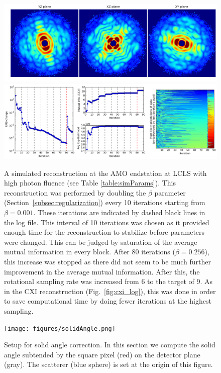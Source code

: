 \documentclass[]{iucr}              %
\begin{document}
\begin{figure}
\caption{A simulated reconstruction at the AMO endstation at LCLS with high photon fluence (see Table \ref{table:simParams}). This reconstruction was performed by doubling the $\beta$ parameter (Section~\ref{subsec:regularization}) every 10 iterations starting from $\beta=0.001$. These iterations are indicated by dashed black lines in the log file. This interval of 10 iterations was chosen as it provided enough time for the reconstruction to stabilize before parameters were changed. This can be judged by saturation of the average mutual information in every block. After 80 iterations ($\beta = 0.256$), this increase was stopped as there did not seem to be much further improvement in the average mutual information. After this, the rotational sampling rate was increased from 6 to the target of 9. As in the CXI reconstruction (Fig.~\ref{fig:cxi_log}), this was done in order to save computational time by doing fewer iterations at the highest sampling.}
\includegraphics[width=\textwidth]{figures/amo_high_intens.png} \label{fig:amo_high_intens}
\includegraphics[width=\textwidth]{figures/amo_high_log.png} \label{fig:amo_high_log}
\end{figure}

\begin{figure}
\caption{Setup for solid angle correction. In this section we compute the solid angle subtended by the square pixel (red) on the detector plane (gray). The scatterer (blue sphere) is set at the origin of this figure.}
\texttt{[image: figures/solidAngle.png]} \label{fig:solidAngle}
\end{figure}
\end{document}
